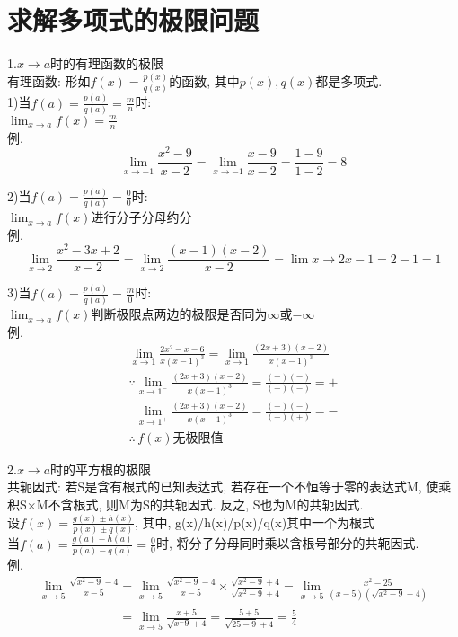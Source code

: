 \chapter{求解多项式的极限问题}
1.$x\to a$时的有理函数的极限\\
有理函数: 形如$f(x)=\frac{p(x)}{q(x)}$的函数, 其中$p(x),q(x)$都是多项式.\\
1)当$f(a)=\frac{p(a)}{q(a)}=\frac{m}{n}$时:\\
$\displaystyle\lim_{x\to a}f(x)=\frac{m}{n}$\\
例.
\[\lim_{x\to -1}\frac{x^2-9}{x-2}=\lim_{x\to -1}\frac{x-9}{x-2}=\frac{1-9}{1-2}=8\]

2)当$f(a)=\frac{p(a)}{q(a)}=\frac{0}{0}$时:\\
$\displaystyle\lim_{x\to a}f(x)$进行分子分母约分\\
例.
\[\lim_{x\to 2}\frac{x^2-3x+2}{x-2}=\lim_{x\to 2}\frac{(x-1)(x-2)}{x-2}=\lim{x\to 2}x-1=2-1=1\]

3)当$f(a)=\frac{p(a)}{q(a)}=\frac{m}{0}$时:\\
$\displaystyle\lim_{x\to a}f(x)$判断极限点两边的极限是否同为$\infty$或$-\infty$\\
例.
\begin{displaymath}
\begin{array}{l}
    \displaystyle\lim_{x\to 1}\frac{2x^2-x-6}{x(x-1)^3}=\lim_{x\to 1}\frac{(2x+3)(x-2)}{x(x-1)^3}\\
	\displaystyle\mathbf{\because}\lim_{x\to 1^-}\frac{(2x+3)(x-2)}{x(x-1)^3}=\frac{(+)(-)}{(+)(-)}=+\\
    \displaystyle\phantom{\because}\lim_{x\to 1^+}\frac{(2x+3)(x-2)}{x(x-1)^3}=\frac{(+)(-)}{(+)(+)}=-\\
	\displaystyle\mathbf{\therefore}\,f(x)\text{无极限值}
\end{array}
\end{displaymath}\vspace{2ex}

2.$x\to a$时的平方根的极限\\
共轭因式: 若S是含有根式的已知表达式, 若存在一个不恒等于零的表达式M, 使乘积S$\times$M不含根式, 则M为S的共轭因式. 反之, S也为M的共轭因式.\\
设$f(x)=\frac{g(x)\pm h(x)}{p(x)\pm q(x)}$, 其中, g(x)/h(x)/p(x)/q(x)其中一个为根式\\
当$f(a)=\frac{g(a)-h(a)}{p(a)-q(a)}=\frac{0}{0}$时, 将分子分母同时乘以含根号部分的共轭因式.\\
例.
\begin{displaymath}
\begin{array}{l}
    \displaystyle\lim_{x\to 5}\frac{\sqrt{x^2-9}-4}{x-5}=\lim_{x\to 5}\frac{\sqrt{x^2-9}-4}{x-5}\times\frac{\sqrt{x^2-9}+4}{\sqrt{x^2-9}+4}=\lim_{x\to 5}\frac{x^2-25}{(x-5)(\sqrt{x^2-9}+4)}\\
    \displaystyle\phantom{\lim_{x\to 5}\frac{\sqrt{x^2-9}-4}{x-5}}=\lim_{x\to 5}\frac{x+5}{\sqrt{x^-9}+4}=\frac{5+5}{\sqrt{25-9}+4}=\frac{5}{4}
\end{array}
\end{displaymath}\vspace{2ex}

